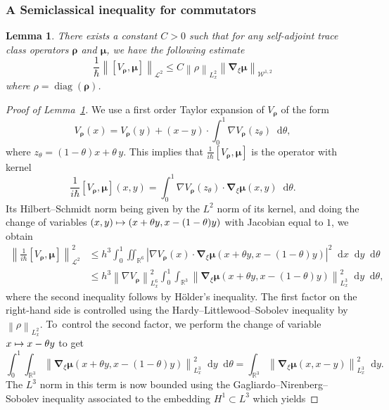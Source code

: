 \documentclass[11pt]{article}
\newcommand{\Subsubsection}{\subsubsection}
\newcommand\mto{\mathchoice{\longmapsto}{\mapsto}{\mapsto}{\mapsto}}
\newtheorem{lem}{Lemma}[section]
\theoremstyle{definition}
\newcommand {\RR} {\mathbb R}
\newcommand {\Rd} {\RR^3}
\newcommand {\RRd} {\RR^6}
\renewcommand {\L} {\mathcal L}
\newcommand {\cW} {\mathcal W}
\let\lt\left
\let\rt\right
\renewcommand {\(} {\lt(}
\renewcommand {\)} {\rt)}
\newcommand {\com}[1] {\lt[{#1}\rt]}
\newcommand {\n}[1] {\lt\lvert #1 \rt\rvert}
\newcommand {\nrm}[1] {\lt\lVert #1\rt\rVert}
\newcommand {\Nrm}[2] {\nrm{#1}_{#2}}
\renewcommand {\d} {\mathop{}\!\mathrm{d}}
\DeclareMathOperator{\diag} {diag}
\newcommand {\Diag}[1] {\diag\!\( #1 \)}
\newcommand {\intd} {\int_{\Rd}}
\newcommand {\iintd} {\iint_{\RRd}}
\newcommand {\op} {\boldsymbol{\rho}}
\newcommand {\opmu} {\boldsymbol{\mu}}
\newcommand {\Dh} {\boldsymbol{\nabla}}
\newcommand {\Dhv}[1] {\Dh_{\!\xi} #1}
\begin{document}
\Subsubsection{A Semiclassical inequality for commutators}

\begin{lem}\label{lem:commutator_estimate_HS}
There exists a constant $C>0$ such that for any self-adjoint trace class operators $\op$ and $\opmu$, we have the following estimate
\begin{equation*}
\frac{1}{\hbar} \Nrm{\com{V_{\op},\opmu}}{\L^2} \leq C \Nrm{\rho}{L^2_x} \Nrm{\Dhv \opmu}{\cW^{1,2}}
\end{equation*}
where $\rho = \Diag{\op}$.
\end{lem}

\begin{proof}[Proof of Lemma~\ref{lem:commutator_estimate_HS}]
We use a first order Taylor expansion of $V_{\op}$ of the form
\begin{equation*}
V_{\op}(x) = V_{\op}(y) + \(x-y\)\cdot \int_0^1 \nabla V_{\op}(z_\theta)\d\theta,
\end{equation*}
where $z_\theta = \(1-\theta\)x+\theta\, y$. This implies that $\frac{1}{i\hbar}\com{V_{\op},\opmu}$ is the operator with kernel
\begin{equation*}
\frac{1}{i\hbar}\com{V_{\op},\opmu}(x,y) = \int_0^1 \nabla V_{\op}(z_\theta) \cdot \Dhv \opmu(x,y) \d\theta.
\end{equation*}
Its Hilbert--Schmidt norm being given by the $L^2$ norm of its kernel, and doing the change of variables $(x,y) \mto (x+\theta y, x-(1-\theta) y)$ with Jacobian equal to $1$, we obtain
\begin{align*}
\Nrm{\tfrac{1}{i\hbar}\com{V_{\op},\opmu}}{\L^2}^2 &\leq {h^3}\int_0^1\!\!\! \iintd \n{\nabla V_{\op}(x) \cdot \Dhv \opmu(x+\theta y,x-(1-\theta) y)}^2\d x\d y \d\theta
\\[-3pt]
&\leq {h^3} \Nrm{\nabla V_{\op}}{L_x^6}^2 \int_0^1\!\!\! \intd \Nrm{\Dhv \opmu(x+\theta y,x-(1-\theta) y)}{L^3_x}^2 \d y \d\theta,
\end{align*}
where the second inequality follows by Hölder's inequality. The first factor on the right-hand side is controlled using the Hardy--Littlewood--Sobolev inequality by $\Nrm{\rho}{L^2_x}$. To~control the second factor, we perform the change of variable $x\mto x-\theta y$ to get\vspace*{-3pt}
\begin{equation*}
\int_0^1\!\!\! \intd \Nrm{\Dhv \opmu(x+\theta y,x-(1-\theta) y)}{L^3_x}^2 \d y \d\theta = \intd \Nrm{\Dhv \opmu(x,x-y)}{L^3_x}^2 \d y.
\end{equation*}
The $L^3$ norm in this term is now bounded using the Gagliardo--Nirenberg--Sobolev inequality associated to the embedding $H^1\subset L^3$ which yields

\end{proof}
\end{document}

